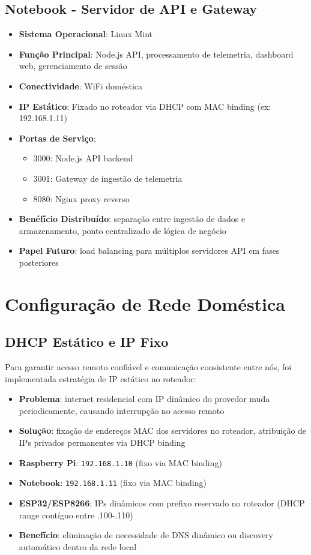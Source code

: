 \documentclass[12pt,a4paper,oneside]{report}
\begin{document}
\subsection{Notebook - Servidor de API e Gateway}
\begin{itemize}[leftmargin=1.2cm]
    \item \textbf{Sistema Operacional}: Linux Mint
    \item \textbf{Função Principal}: Node.js API, processamento de telemetria, dashboard web, gerenciamento de sessão
    \item \textbf{Conectividade}: WiFi doméstica
    \item \textbf{IP Estático}: Fixado no roteador via DHCP com MAC binding (ex: 192.168.1.11)
    \item \textbf{Portas de Serviço}:
    \begin{itemize}
        \item 3000: Node.js API backend
        \item 3001: Gateway de ingestão de telemetria
        \item 8080: Nginx proxy reverso
    \end{itemize}
    \item \textbf{Benéfício Distribuído}: separação entre ingestão de dados e armazenamento, ponto centralizado de lógica de negócio
    \item \textbf{Papel Futuro}: load balancing para múltiplos servidores API em fases posteriores
\end{itemize}

\section{Configuração de Rede Doméstica}

\subsection{DHCP Estático e IP Fixo}
Para garantir acesso remoto confiável e comunicação consistente entre nós, foi implementada estratégia de IP estático no roteador:

\begin{itemize}[leftmargin=1.2cm]
    \item \textbf{Problema}: internet residencial com IP dinâmico do provedor muda periodicamente, causando interrupção no acesso remoto
    \item \textbf{Solução}: fixação de endereços MAC dos servidores no roteador, atribuição de IPs privados permanentes via DHCP binding
    \item \textbf{Raspberry Pi}: \texttt{192.168.1.10} (fixo via MAC binding)
    \item \textbf{Notebook}: \texttt{192.168.1.11} (fixo via MAC binding)
    \item \textbf{ESP32/ESP8266}: IPs dinâmicos com prefixo reservado no roteador (DHCP range contíguo entre .100-.110)
    \item \textbf{Benefício}: eliminação de necessidade de DNS dinâmico ou discovery automático dentro da rede local
\end{itemize}
\end{document}
